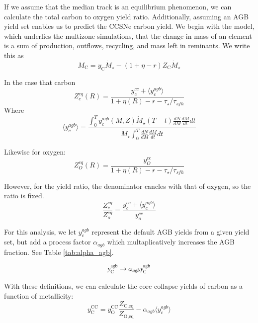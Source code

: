 \documentclass[12pt,oneside]{report}
\newcommand{\Ycagb}{\ensuremath{y_{\rm C}^{\rm agb}}}
\begin{document}
If we assume that the median track is an equilibrium phenomenon, we can calculate the total carbon to oxygen yield ratio. Additionally, assuming an AGB yield set enables us to predict the CCSNe carbon yield.  
We begin with the model, which underlies the multizone simulations, that the change in mass of an element is a sum of production, outflows, recycling, and mass left in reminants. We write this as
\begin{equation}
M_\text{C} = y_\text{C} \dot{M}_\star - (1 + \eta - r) Z_\text{C} \dot{M}_\star
\end{equation}

In the case that carbon
\begin{equation}
Z_c^{eq}(R) = \frac{y_c^{cc} + \langle y_c^{agb} \rangle }{1 + \eta(R) - r - \tau_\star / \tau_{sfh}}
\end{equation}Where
\begin{equation}
\langle y_c^{agb} \rangle = \frac{\int_0^T y_c^{agb}(M, Z) \dot{M}_\star(T - t) \frac{dN}{dM} \frac{dM}{dt} dt  }{ \dot{M}_\star \int_0^T \frac{dN}{dM} \frac{dM}{dt} dt}
\end{equation}

Likewise for oxygen:
\begin{equation}
Z_O^{eq}(R) = \frac{y_O^{cc}}{1 + \eta(R) - r - \tau_\star / \tau_{sfh}}
\end{equation}

However, for the yield ratio, the denominator cancles with that of oxygen, so the ratio is fixed.
\begin{equation}
\frac{Z_c^{eq}}{Z_o^{eq}} = \frac{y_c^{cc} + \langle y_c^{agb} \rangle }{y_o^{cc}}
\end{equation}

For this analysis, we let $y_c^{agb}$ represent the default AGB yields from a given yield set, but add a process factor $\alpha_{agb}$ which multaplicatively increases the AGB fraction. See Table \ref{tab:alpha_agb}.

\begin{equation}
    \Ycagb \rightarrow \alpha_{agb}  \Ycagb
\end{equation}

With these definitions, we can calculate the core collapse yields of carbon as a function of metallicity:
\begin{equation}
    y_\text{C}^\text{CC} =  y_\text{O}^\text{CC} \frac{Z_\text{C,eq}}{Z_\text{O,eq}} - \alpha_{agb} \langle y_c^{agb} \rangle
\end{equation}
\end{document}
